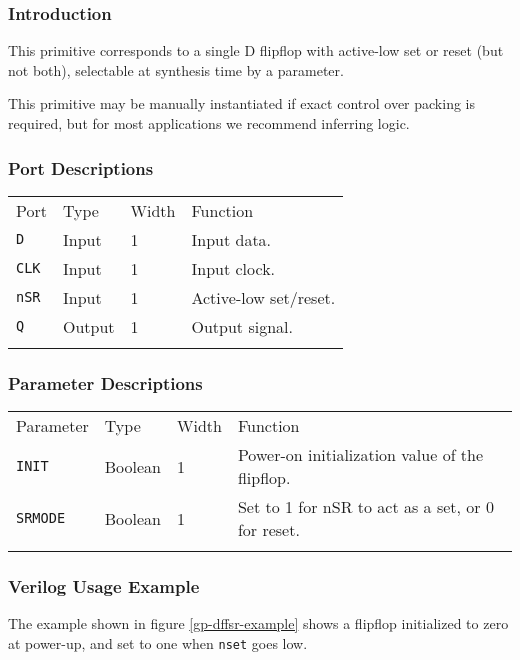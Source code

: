 \documentclass[11pt]{article}
\newcommand{\tokenstyle}[1]{\texttt{#1}}
\newcommand{\wirestyle}[1]{\texttt{#1}}
\newcommand{\whenstyle}[1]{{\fontseries{sb}\selectfont#1}}
\newcommand{\thinhline}{\Xhline{1\arrayrulewidth}}
\newcommand{\thickhline}{\Xhline{2.5\arrayrulewidth}}
\begin{document}
\subsubsection{Introduction}
This primitive corresponds to a single D flipflop with active-low set or reset (but not both), selectable at synthesis
time by a parameter.

This primitive may be manually instantiated if exact control over packing is required, but for most applications we
recommend inferring logic.

\subsubsection{Port Descriptions}

\begin{tabularx}{\textwidth}{lllX}
\thinhline
\whenstyle{Port} & \whenstyle{Type} & \whenstyle{Width} & \whenstyle{Function} \\
\thickhline
\tokenstyle{D} & Input & 1 & Input data. \\
\thinhline
\tokenstyle{CLK} & Input & 1 & Input clock. \\
\thinhline
\tokenstyle{nSR} & Input & 1 & Active-low set/reset. \\
\thinhline
\tokenstyle{Q} & Output & 1 & Output signal. \\
\thinhline
\end{tabularx}

\subsubsection{Parameter Descriptions}

\begin{tabularx}{\textwidth}{lllX}
\thinhline
\whenstyle{Parameter} & \whenstyle{Type} & \whenstyle{Width} & \whenstyle{Function} \\
\thickhline
\tokenstyle{INIT} & Boolean & 1 & Power-on initialization value of the flipflop. \\
\thinhline
\tokenstyle{SRMODE} & Boolean & 1 & Set to 1 for nSR to act as a set, or 0 for reset. \\
\thinhline
\end{tabularx}

\subsubsection{Verilog Usage Example}

The example shown in figure \ref{gp-dffsr-example} shows a flipflop initialized to zero at power-up, and set to one
when \wirestyle{nset} goes low.
\end{document}
